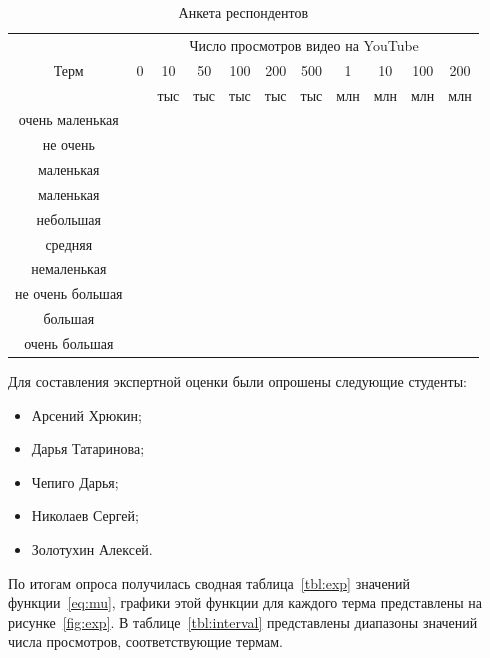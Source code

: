 \captionsetup{justification=raggedright,singlelinecheck=false}
\begin{table}[H]
	\begin{threeparttable}
		\caption{\label{tbl:anketa}Анкета респондентов}
		\begin{tabular}{|c|c|c|c|c|c|c|c|c|c|c|}
			\hline
			& \multicolumn{10}{c|}{Число просмотров видео на YouTube}\\\cline{2-11}
			Терм & 0&	10&	50&	100&	200&	500&	1 &	10 &	100 &	200\\
			& &	тыс&	тыс&	тыс&	тыс&тыс&млн &	млн &	млн& млн\\\hline
			очень маленькая	&&&&&&&&&&\\\hline
			не очень 	&&&&&&&&&&\\
			маленькая&&&&&&&&&&\\\hline
			маленькая	&&&&&&&&&&\\\hline
			небольшая	&&&&&&&&&&\\\hline
			средняя	&&&&&&&&&&\\\hline
			немаленькая	&&&&&&&&&&\\\hline
			не очень большая	&&&&&&&&&&\\\hline
			большая		&&&&&&&&&&\\\hline
			очень большая		&&&&&&&&&&\\\hline
		\end{tabular}
	\end{threeparttable}
\end{table} 

Для составления экспертной оценки были опрошены следующие студенты:
\begin{itemize}[label=---]
	\item Арсений Хрюкин;
	\item Дарья Татаринова;
	\item Чепиго Дарья;
	\item Николаев Сергей;
	\item Золотухин Алексей.
\end{itemize}

По итогам опроса получилась сводная таблица~\ref{tbl:exp} значений функции~\eqref{eq:mu}, графики этой функции для каждого терма представлены на рисунке~\ref{fig:exp}. В таблице~\ref{tbl:interval} представлены диапазоны значений числа просмотров, соответствующие термам. 

